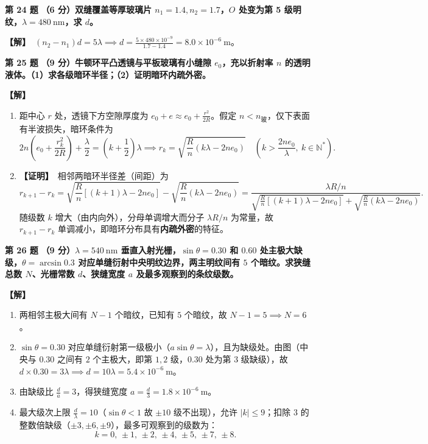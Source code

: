 \documentclass[zihao=5,a4paper,UTF8]{ctexart}
\newenvironment{prob}[2]{%
    \par\vspace{5pt}\noindent\textbf{\color{navy}#1} \textbf{#2}\par\nopagebreak\vspace{2pt}%
}{%
    \par\vspace{3pt}%
}
\newcommand{\sol}{\noindent\textbf{\color{tealaccent}【解】}\ }
\newcommand{\proofbegin}{\noindent\textbf{\color{tealaccent}【证明】}\ }
\begin{document}
\begin{prob}{第 24 题}{（6 分）双缝覆盖等厚玻璃片 $n_1=1.4, n_2=1.7$，$O$ 处变为第 5 级明纹，$\lambda=480\ \mathrm{nm}$，求 $d$。}
\sol $(n_2 - n_1)d = 5\lambda \implies d = \frac{5\times 480\times 10^{-9}}{1.7 - 1.4} = 8.0\times 10^{-6}\ \mathrm{m}$。
\end{prob}

\begin{prob}{第 25 题}{（9 分）牛顿环平凸透镜与平板玻璃有小缝隙 $e_0$，充以折射率 $n$ 的透明液体。（1）求各级暗环半径；（2）证明暗环内疏外密。}
\sol
\begin{enumerate}[leftmargin=2em, itemsep=2pt]
    \item 距中心 $r$ 处，透镜下方空隙厚度为 $e_0 + e \approx e_0 + \frac{r^2}{2R}$。假定 $n < n_{\text{玻}}$，仅下表面有半波损失，暗环条件为
    \[
        2n\left(e_0 + \frac{r_k^2}{2R}\right) + \frac{\lambda}{2} = \left(k + \frac{1}{2}\right)\lambda \implies r_k = \sqrt{\frac{R}{n}(k\lambda - 2ne_0)}\quad \left(k > \frac{2ne_0}{\lambda},\ k\in\mathbb{N}^*\right).
    \]
    \item \proofbegin 相邻两暗环半径差（间距）为
    \[
        r_{k+1} - r_k = \sqrt{\frac{R}{n}[(k+1)\lambda - 2ne_0]} - \sqrt{\frac{R}{n}(k\lambda - 2ne_0)} = \frac{\lambda R/n}{\sqrt{\frac{R}{n}[(k+1)\lambda - 2ne_0]} + \sqrt{\frac{R}{n}(k\lambda - 2ne_0)}}.
    \]
    随级数 $k$ 增大（由内向外），分母单调增大而分子 $\lambda R/n$ 为常量，故 $r_{k+1} - r_k$ 单调减小，即暗环分布具有\textbf{内疏外密}的特征。
\end{enumerate}
\end{prob}

\begin{prob}{第 26 题}{（9 分）$\lambda=540\ \mathrm{nm}$ 垂直入射光栅，$\sin\theta = 0.30$ 和 $0.60$ 处主极大缺级，$\theta=\arcsin 0.3$ 对应单缝衍射中央明纹边界，两主明纹间有 $5$ 个暗纹。求狭缝总数 $N$、光栅常数 $d$、狭缝宽度 $a$ 及最多观察到的条纹级数。}
\sol
\begin{enumerate}[leftmargin=2em, itemsep=2pt]
    \item 两相邻主极大间有 $N-1$ 个暗纹，已知有 $5$ 个暗纹，故 $N - 1 = 5 \implies N = 6$。
    \item $\sin\theta = 0.30$ 对应单缝衍射第一级极小（$a\sin\theta = \lambda$），且为缺级处。由图（中央与 $0.30$ 之间有 $2$ 个主极大，即第 $1, 2$ 级，$0.30$ 处为第 $3$ 级缺级），故 $d\times 0.30 = 3\lambda \implies d = 10\lambda = 5.4\times 10^{-6}\ \mathrm{m}$。
    \item 由缺级比 $\frac{d}{a} = 3$，得狭缝宽度 $a = \frac{d}{3} = 1.8\times 10^{-6}\ \mathrm{m}$。
    \item 最大级次上限 $\frac{d}{\lambda} = 10$（$\sin\theta < 1$ 故 $\pm 10$ 级不出现），允许 $|k| \le 9$；扣除 $3$ 的整数倍缺级（$\pm 3, \pm 6, \pm 9$），最多可观察到的级数为：
    \[
        k = 0,\, \pm 1,\, \pm 2,\, \pm 4,\, \pm 5,\, \pm 7,\, \pm 8.
    \]
\end{enumerate}
\end{prob}
\end{document}
